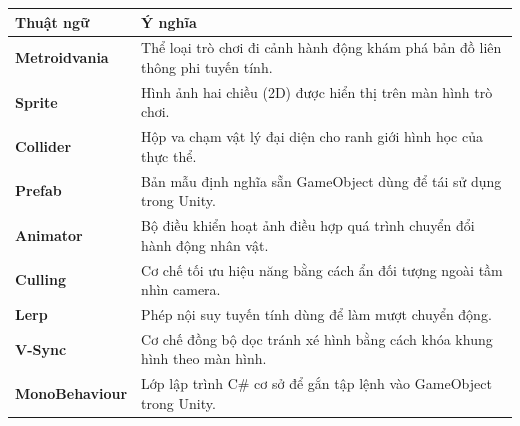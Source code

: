 \documentclass[../DoAn.tex]{subfiles}
\begin{document}
\begin{longtable}{l p{11cm}}
	\hline
   \textbf{Thuật ngữ}  & \textbf{Ý nghĩa} \\ \hline 
	\textbf{Metroidvania} & Thể loại trò chơi đi cảnh hành động khám phá bản đồ liên thông phi tuyến tính.\\
	\textbf{Sprite} & Hình ảnh hai chiều (2D) được hiển thị trên màn hình trò chơi.\\
	\textbf{Collider} & Hộp va chạm vật lý đại diện cho ranh giới hình học của thực thể.\\
	\textbf{Prefab} & Bản mẫu định nghĩa sẵn GameObject dùng để tái sử dụng trong Unity.\\
	\textbf{Animator} & Bộ điều khiển hoạt ảnh điều hợp quá trình chuyển đổi hành động nhân vật.\\
	\textbf{Culling} & Cơ chế tối ưu hiệu năng bằng cách ẩn đối tượng ngoài tầm nhìn camera.\\
	\textbf{Lerp} & Phép nội suy tuyến tính dùng để làm mượt chuyển động.\\
	\textbf{V-Sync} & Cơ chế đồng bộ dọc tránh xé hình bằng cách khóa khung hình theo màn hình.\\
	\textbf{MonoBehaviour} & Lớp lập trình C\# cơ sở để gắn tập lệnh vào GameObject trong Unity.\\
    \hline
\end{longtable}
\end{document}
